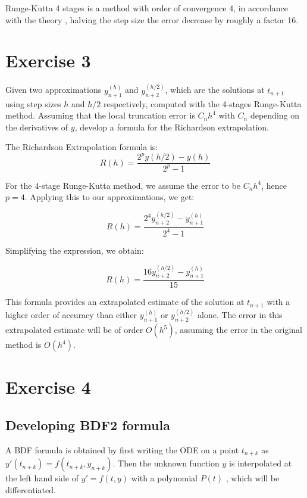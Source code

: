 \documentclass[a4paper,12pt]{article}
\begin{document}
Runge-Kutta 4 stages is a method with order of convergence 4, in accordance with the theory , halving the step size the error decrease by roughly a factor 16. 

\section{Exercise 3}

Given two approximations $y_{n+1}^{(h)}$ and $y_{n+2}^{(h/2)}$, which are the solutions at $t_{n+1}$ using step sizes $h$ and $h/2$ respectively, computed with the 4-stages Runge-Kutta method. Assuming that the local truncation error is $C_nh^4$ with $C_n$ depending on the derivatives of $y$, develop a formula for the Richardson extrapolation.

The Richardson Extrapolation formula is:
\begin{equation}
    R(h) = \frac{2^p y(h/2) - y(h)}{2^p - 1}
\end{equation}

For the 4-stage Runge-Kutta method, we assume the error to be $C_nh^4$, hence $p = 4$. Applying this to our approximations, we get:

\begin{equation}
    R(h) = \frac{2^4 y_{n+2}^{(h/2)} - y_{n+1}^{(h)}}{2^4 - 1}
\end{equation}

Simplifying the expression, we obtain:

\begin{equation}
    R(h) = \frac{16 y_{n+2}^{(h/2)} - y_{n+1}^{(h)}}{15}
\end{equation}

This formula provides an extrapolated estimate of the solution at $t_{n+1}$ with a higher order of accuracy than either $y_{n+1}^{(h)}$ or $y_{n+2}^{(h/2)}$ alone.
The error in this extrapolated estimate will be of order $O(h^5)$, assuming the error in the original method is $O(h^4)$.




\section{Exercise 4}
\subsection*{Developing BDF2 formula}
A BDF formula is obtained by first writing the ODE on a point \(t_{n+k}\) as \(y'(t_{n+k}) = f(t_{n+k}, y_{n+k})\). Then the unknown function \(y\) is interpolated at the left hand side of \(y' = f(t, y)\) with a polynomial \(P(t)\) , which will be differentiated.
\end{document}
